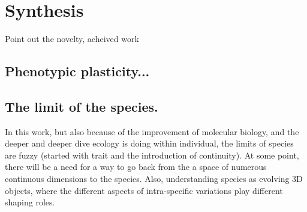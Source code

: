 

\chapter{Synthesis}

Point out the novelty, acheived work 

\section{Phenotypic plasticity...}

\section{The limit of the species.}

In this work, but also because of the improvement of molecular biology, and the deeper and deeper dive ecology is doing within individual, the limits of species are fuzzy (started with trait and the introduction of continuity). At some point, there will be a need for a way to go back from the a space of numerous continuous dimensions to the species. Also, understanding species as evolving 3D objects, where the different aspects of intra-specific variations play different shaping roles.